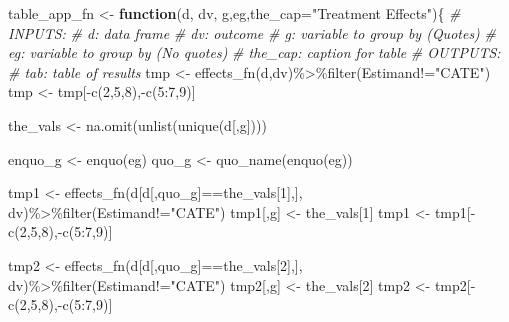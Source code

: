 \documentclass[
]{article}
\newenvironment{Shaded}{\begin{snugshade}}{\end{snugshade}}
\newcommand{\AttributeTok}[1]{\textcolor[rgb]{0.77,0.63,0.00}{#1}}
\newcommand{\CommentTok}[1]{\textcolor[rgb]{0.56,0.35,0.01}{\textit{#1}}}
\newcommand{\ControlFlowTok}[1]{\textcolor[rgb]{0.13,0.29,0.53}{\textbf{#1}}}
\newcommand{\DecValTok}[1]{\textcolor[rgb]{0.00,0.00,0.81}{#1}}
\newcommand{\FunctionTok}[1]{\textcolor[rgb]{0.00,0.00,0.00}{#1}}
\newcommand{\NormalTok}[1]{#1}
\newcommand{\OtherTok}[1]{\textcolor[rgb]{0.56,0.35,0.01}{#1}}
\newcommand{\SpecialCharTok}[1]{\textcolor[rgb]{0.00,0.00,0.00}{#1}}
\newcommand{\StringTok}[1]{\textcolor[rgb]{0.31,0.60,0.02}{#1}}
\begin{document}
\begin{Shaded}
\begin{Highlighting}[]
\NormalTok{table\_app\_fn }\OtherTok{\textless{}{-}} \ControlFlowTok{function}\NormalTok{(d, dv, g,eg,}\AttributeTok{the\_cap=}\StringTok{"Treatment Effects"}\NormalTok{)\{}
  \CommentTok{\# INPUTS:}
    \CommentTok{\# d: data frame}
    \CommentTok{\# dv: outcome}
    \CommentTok{\# g: variable to group by (Quotes)}
    \CommentTok{\# eg: variable to group by (No quotes)}
    \CommentTok{\# the\_cap: caption for table}
  \CommentTok{\# OUTPUTS:}
    \CommentTok{\# tab: table of results}
\NormalTok{  tmp }\OtherTok{\textless{}{-}} \FunctionTok{effects\_fn}\NormalTok{(d,dv)}\SpecialCharTok{\%\textgreater{}\%}\FunctionTok{filter}\NormalTok{(Estimand}\SpecialCharTok{!=}\StringTok{"CATE"}\NormalTok{)}
\NormalTok{  tmp }\OtherTok{\textless{}{-}}\NormalTok{ tmp[}\SpecialCharTok{{-}}\FunctionTok{c}\NormalTok{(}\DecValTok{2}\NormalTok{,}\DecValTok{5}\NormalTok{,}\DecValTok{8}\NormalTok{),}\SpecialCharTok{{-}}\FunctionTok{c}\NormalTok{(}\DecValTok{5}\SpecialCharTok{:}\DecValTok{7}\NormalTok{,}\DecValTok{9}\NormalTok{)]}

  
  
  
\NormalTok{  the\_vals }\OtherTok{\textless{}{-}} \FunctionTok{na.omit}\NormalTok{(}\FunctionTok{unlist}\NormalTok{(}\FunctionTok{unique}\NormalTok{(d[,g])))}

\NormalTok{  enquo\_g }\OtherTok{\textless{}{-}} \FunctionTok{enquo}\NormalTok{(eg)}
\NormalTok{  quo\_g }\OtherTok{\textless{}{-}} \FunctionTok{quo\_name}\NormalTok{(}\FunctionTok{enquo}\NormalTok{(eg))}
  
\NormalTok{  tmp1 }\OtherTok{\textless{}{-}} \FunctionTok{effects\_fn}\NormalTok{(d[d[,quo\_g]}\SpecialCharTok{==}\NormalTok{the\_vals[}\DecValTok{1}\NormalTok{],], dv)}\SpecialCharTok{\%\textgreater{}\%}\FunctionTok{filter}\NormalTok{(Estimand}\SpecialCharTok{!=}\StringTok{"CATE"}\NormalTok{)}
\NormalTok{  tmp1[,g] }\OtherTok{\textless{}{-}}\NormalTok{ the\_vals[}\DecValTok{1}\NormalTok{]}
\NormalTok{  tmp1 }\OtherTok{\textless{}{-}}\NormalTok{ tmp1[}\SpecialCharTok{{-}}\FunctionTok{c}\NormalTok{(}\DecValTok{2}\NormalTok{,}\DecValTok{5}\NormalTok{,}\DecValTok{8}\NormalTok{),}\SpecialCharTok{{-}}\FunctionTok{c}\NormalTok{(}\DecValTok{5}\SpecialCharTok{:}\DecValTok{7}\NormalTok{,}\DecValTok{9}\NormalTok{)]}
  
\NormalTok{  tmp2 }\OtherTok{\textless{}{-}} \FunctionTok{effects\_fn}\NormalTok{(d[d[,quo\_g]}\SpecialCharTok{==}\NormalTok{the\_vals[}\DecValTok{2}\NormalTok{],], dv)}\SpecialCharTok{\%\textgreater{}\%}\FunctionTok{filter}\NormalTok{(Estimand}\SpecialCharTok{!=}\StringTok{"CATE"}\NormalTok{)}
\NormalTok{  tmp2[,g] }\OtherTok{\textless{}{-}}\NormalTok{ the\_vals[}\DecValTok{2}\NormalTok{]}
\NormalTok{  tmp2 }\OtherTok{\textless{}{-}}\NormalTok{ tmp2[}\SpecialCharTok{{-}}\FunctionTok{c}\NormalTok{(}\DecValTok{2}\NormalTok{,}\DecValTok{5}\NormalTok{,}\DecValTok{8}\NormalTok{),}\SpecialCharTok{{-}}\FunctionTok{c}\NormalTok{(}\DecValTok{5}\SpecialCharTok{:}\DecValTok{7}\NormalTok{,}\DecValTok{9}\NormalTok{)]}



\end{Highlighting}
\end{Shaded}
\end{document}
